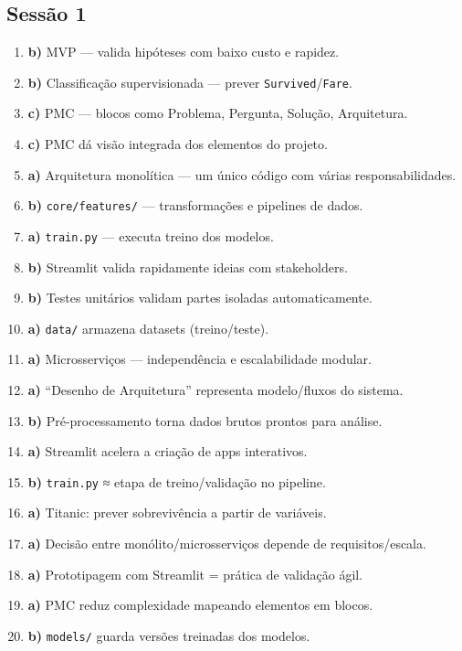 \documentclass[12pt,a4paper]{article}
\begin{document}
\subsection*{Sessão 1}
\begin{enumerate}
  \item \textbf{b)} MVP — valida hipóteses com baixo custo e rapidez.
  \item \textbf{b)} Classificação supervisionada — prever \texttt{Survived}/\texttt{Fare}.
  \item \textbf{c)} PMC — blocos como Problema, Pergunta, Solução, Arquitetura.
  \item \textbf{c)} PMC dá visão integrada dos elementos do projeto.
  \item \textbf{a)} Arquitetura monolítica — um único código com várias responsabilidades.
  \item \textbf{b)} \texttt{core/features/} — transformações e pipelines de dados.
  \item \textbf{a)} \texttt{train.py} — executa treino dos modelos.
  \item \textbf{b)} Streamlit valida rapidamente ideias com stakeholders.
  \item \textbf{b)} Testes unitários validam partes isoladas automaticamente.
  \item \textbf{a)} \texttt{data/} armazena datasets (treino/teste).
  \item \textbf{a)} Microsserviços — independência e escalabilidade modular.
  \item \textbf{a)} “Desenho de Arquitetura” representa modelo/fluxos do sistema.
  \item \textbf{b)} Pré-processamento torna dados brutos prontos para análise.
  \item \textbf{a)} Streamlit acelera a criação de apps interativos.
  \item \textbf{b)} \texttt{train.py} ≈ etapa de treino/validação no pipeline.
  \item \textbf{a)} Titanic: prever sobrevivência a partir de variáveis.
  \item \textbf{a)} Decisão entre monólito/microsserviços depende de requisitos/escala.
  \item \textbf{a)} Prototipagem com Streamlit = prática de validação ágil.
  \item \textbf{a)} PMC reduz complexidade mapeando elementos em blocos.
  \item \textbf{b)} \texttt{models/} guarda versões treinadas dos modelos.
\end{enumerate}
\end{document}
